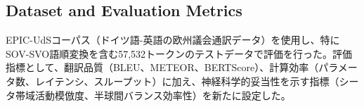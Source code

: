 \subsection{Dataset and Evaluation Metrics}

EPIC-UdSコーパス（ドイツ語-英語の欧州議会通訳データ）を使用し、特にSOV-SVO語順変換を含む57,532トークンのテストデータで評価を行った。評価指標として、翻訳品質（BLEU、METEOR、BERTScore）、計算効率（パラメータ数、レイテンシ、スループット）に加え、神経科学的妥当性を示す指標（シータ帯域活動模倣度、半球間バランス効率性）を新たに設定した。
